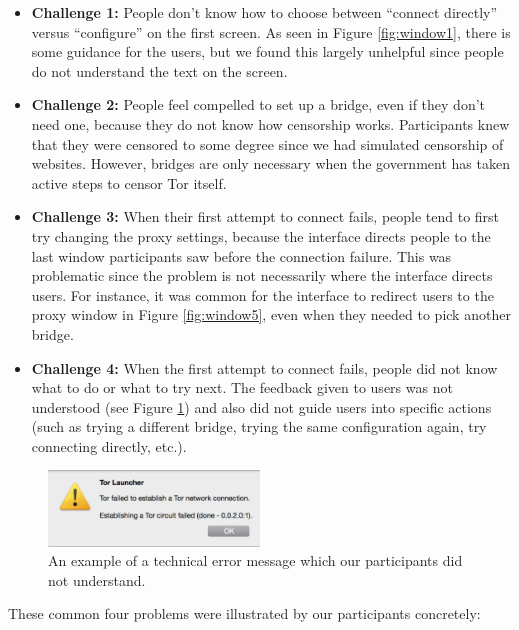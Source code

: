\documentclass{template}
\begin{document}
\begin{itemize} \itemsep1pt \parskip0pt 
\item {\bfseries Challenge 1:} People don't know how to choose between ``connect directly'' versus ``configure'' on the first screen. As seen in Figure \ref{fig:window1}, there is some guidance for the users, but we found this largely unhelpful since people do not understand the text on the screen. 
\item {\bfseries Challenge 2:} People feel compelled to set up a bridge, even if they don't need one, because they do not know how censorship works. Participants knew that they were censored to some degree since we had simulated censorship of websites. However, bridges are only necessary when the government has taken active steps to censor Tor itself.
\item {\bfseries Challenge 3:} When their first attempt to connect fails, people tend to first try changing the proxy settings, because the interface directs people to the last window participants saw before the connection failure. This was problematic since the problem is not necessarily where the interface directs users. For instance, it was common for the interface to redirect users to the proxy window in Figure \ref{fig:window5}, even when they needed to pick another bridge. 
\item {\bfseries Challenge 4:} When the first attempt to connect fails, people did not know what to do or what to try next. The feedback given to users was not understood (see Figure \ref{fig:error}) and also did not guide users into specific actions (such as trying a different bridge, trying the same configuration again, try connecting directly, etc.).
\end{itemize}

\begin{figure}[t]
  \centering
    \includegraphics[width=0.5\textwidth]{error.png}
    \caption{An example of a technical error message which our participants did not understand.}
\label{fig:error}
\end{figure}

These common four problems were illustrated by our participants concretely:
\end{document}
